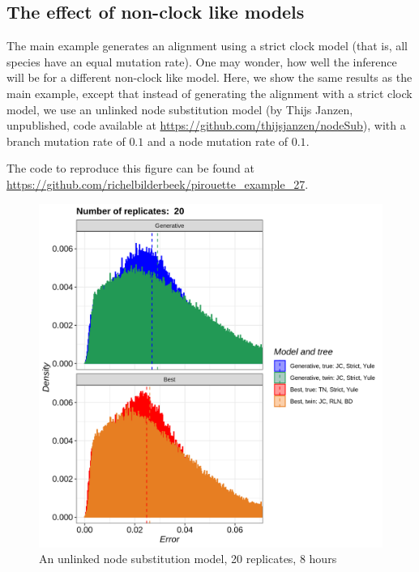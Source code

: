 \subsection{The effect of non-clock like models}
\label{subsec:non_clock}

The main example generates an alignment using a strict clock model (that is,
all species have an equal mutation rate).
One may wonder, how well the inference will be for a different non-clock like
model.
Here, we show the same results as the main example,
except that instead of generating the alignment with a strict clock
model, we use an unlinked node substitution model (by Thijs Janzen,
unpublished, code available at \url{https://github.com/thijsjanzen/nodeSub}),
with a branch mutation rate of $0.1$ and a node mutation rate of $0.1$.

The code to reproduce this figure can be found at  
\url{https://github.com/richelbilderbeek/pirouette_example_27}.

\begin{figure}[H]
  \includegraphics[width=\textwidth]{pirouette_example_27/errors.png}
  \caption{An unlinked node substitution model, 20 replicates, 8 hours}
\end{figure}

